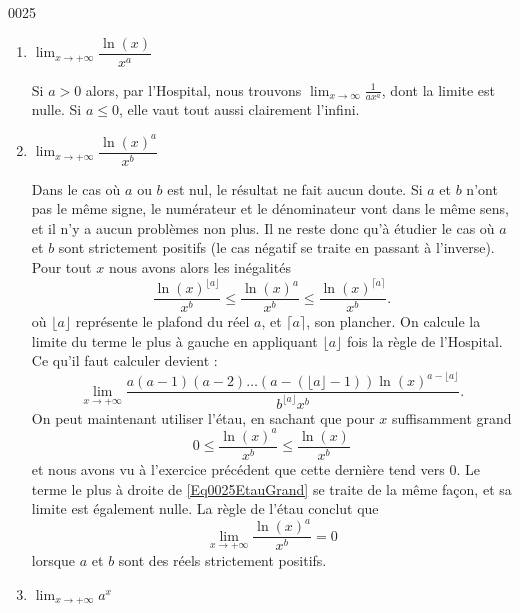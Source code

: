 
\begin{corrige}{0025}



\begin{enumerate}
\item 
 $\lim_{x\rightarrow +\infty} \dfrac{\ln(x)}{x^a}  $

Si $a>0$ alors, par l'Hospital, nous trouvons $\lim_{x\to\infty}\frac{1}{ ax^a }$, dont la limite est nulle. Si $a\leq0$, elle vaut tout aussi clairement l'infini.

\item
  $\lim_{x\rightarrow +\infty} \dfrac{\ln(x)^a}{x^b}  $

Dans le cas où $a$ ou $b$ est nul, le résultat ne fait aucun doute. Si $a$ et $b$ n'ont pas le même signe, le numérateur et le dénominateur vont dans le même sens, et il n'y a aucun problèmes non plus. Il ne reste donc qu'à étudier le cas où $a$ et $b$ sont strictement positifs (le cas négatif se traite en passant à l'inverse). Pour tout $x$ nous avons alors les inégalités
\begin{equation}		\label{Eq0025EtauGrand}
	\frac{ \ln(x)^{\lfloor a\rfloor} }{ x^b }\leq\frac{ \ln(x)^{a} }{ x^b }\leq\frac{ \ln(x)^{\lceil a\rceil} }{ x^b }.
\end{equation}
où $\lfloor a \rfloor$ représente le plafond du réel $a$, et $\lceil a\rceil$, son plancher. On calcule la limite du terme le plus à gauche en appliquant $\lfloor a\rfloor$ fois la règle de l'Hospital. Ce qu'il faut calculer devient :
\[ 
\lim_{x\rightarrow +\infty} \dfrac{a(a-1)(a-2)\ldots(a-(\lfloor a \rfloor-1))\ln(x)^{a-\lfloor a \rfloor}}{b^{\lfloor a \rfloor}x^b} .
\]
On peut maintenant utiliser l'étau, en sachant que pour $x$ suffisamment grand \[0 \leq \dfrac{\ln(x)^a}{x^b} \leq \dfrac{\ln(x)}{x^b}\] et nous avons vu à l'exercice précédent que cette dernière tend vers $0$. Le terme le plus à droite de \eqref{Eq0025EtauGrand} se traite de la même façon, et sa limite est également nulle. La règle de l'étau conclut que
\begin{equation}
	\lim_{x\rightarrow +\infty} \dfrac{\ln(x)^a}{x^b}  =0
\end{equation}
lorsque $a$ et $b$ sont des réels strictement positifs.

\item
 $\lim_{x\rightarrow +\infty} a^x $


\end{enumerate}
\end{corrige}
